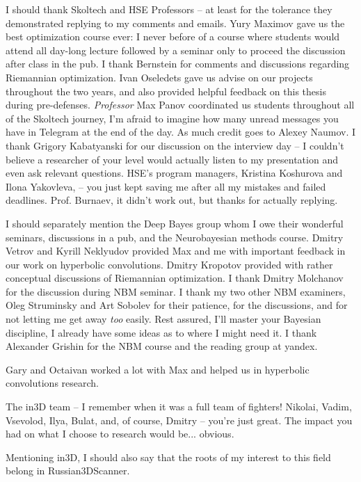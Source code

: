 I should thank Skoltech and HSE Professors -- at least for the tolerance they
demonstrated replying to my comments and emails. Yury Maximov gave us the best
optimization course ever: I never before of a course where students would
attend all day-long lecture followed by a seminar only to proceed the
discussion after class in the pub. I thank Bernstein for comments and
discussions regarding Riemannian optimization. Ivan Oseledets gave us advise on
our projects throughout the two years, and also provided helpful feedback on
this thesis during pre-defenses. \emph{Professor} Max Panov coordinated
us students throughout all of the Skoltech journey, I'm afraid to imagine how
many unread messages you have in Telegram at the end of the day. As much credit
goes to Alexey Naumov.  I thank Grigory Kabatyanski for our discussion on the
interview day -- I couldn't believe a researcher of your level would actually
listen to my presentation and even ask relevant questions. HSE's program
managers, Kristina Koshurova and Ilona Yakovleva, -- you just kept saving me
after all my mistakes and failed deadlines. Prof. Burnaev, it didn't work out,
but thanks for actually replying.

I should separately mention the Deep Bayes group whom I owe their wonderful
seminars, discussions in a pub, and the Neurobayesian methods course. Dmitry Vetrov
and Kyrill Neklyudov provided Max and me with important feedback in our work on
hyperbolic convolutions. Dmitry Kropotov provided with rather conceptual
discussions of Riemannian optimization. I thank Dmitry Molchanov for the discussion
during NBM seminar. I thank my two other NBM examiners, Oleg Struminsky and Art
Sobolev for their patience, for the discussions, and for not letting me get away
\emph{too} easily. Rest assured, I'll master your Bayesian discipline, I
already have some ideas as to where I might need it. I thank Alexander Grishin
for the NBM course and the reading group at yandex.

Gary and Octaivan worked a lot with Max and helped us in hyperbolic convolutions
research.

The in3D team -- I remember when it was a full team of fighters! Nikolai,
Vadim, Vsevolod, Ilya, Bulat, and, of course, Dmitry -- you're just great.
The impact you had on what I choose to research would be... obvious.

Mentioning in3D, I should also say that the roots of my interest to this field
belong in Russian3DScanner.

